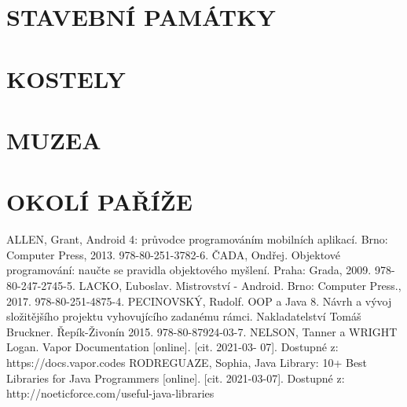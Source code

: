 \documentclass[12pt]{report}
\begin{document}
\thispagestyle{empty}

\tableofcontents
\clearpage

\chapter{STAVEBNÍ PAMÁTKY}



\chapter{KOSTELY}


\chapter{MUZEA}


\chapter{OKOLÍ PAŘÍŽE }


\listoffigures



\printindex




\begin{thebibliography}{H99}
 ALLEN, Grant, Android 4: průvodce programováním mobilních aplikací. Brno: Computer Press, 2013. 978-80-251-3782-6. 
 ČADA, Ondřej. Objektové programování: naučte se pravidla objektového myšlení. Praha: Grada, 2009. 978-80-247-2745-5.
 LACKO, Ľuboslav. Mistrovství - Android. Brno: Computer Press., 2017. 978-80-251-4875-4.
 PECINOVSKÝ, Rudolf.  OOP a Java 8. Návrh a vývoj složitějšího projektu vyhovujícího zadanému rámci. Nakladatelství Tomáš Bruckner. Řepík-Živonín 2015. 978-80-87924-03-7.
 NELSON, Tanner a WRIGHT Logan. Vapor Documentation [online]. [cit. 2021-03- 07]. Dostupné z: https://docs.vapor.codes
 RODREGUAZE, Sophia, Java Library: 10+ Best Libraries for Java Programmers [online]. [cit. 2021-03-07]. Dostupné z: http://noeticforce.com/useful-java-libraries
\end{thebibliography}
\end{document}
